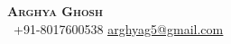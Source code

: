 \begin{center}
    \textbf{\Huge \scshape Arghya Ghosh} \\ \vspace{1pt}
     \ \small +91-8017600538 \quad
    \href{mailto:arghyag5@gmail.com}{ \underline{arghyag5@gmail.com}} \quad
\end{center}